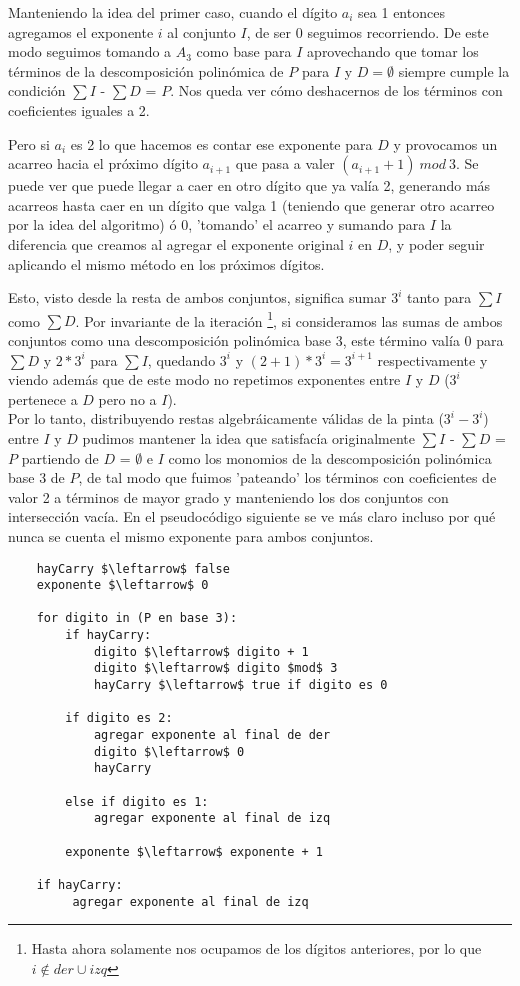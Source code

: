 	Manteniendo la idea del primer caso, cuando el dígito $a_i$ sea 1 entonces agregamos el exponente $i$ al conjunto $I$, de ser 0 seguimos recorriendo. De este modo seguimos tomando a $A_3$ como base para $I$ aprovechando que tomar los términos de la descomposición polinómica de $P$ para $I$ y $D = \emptyset$ siempre cumple la condición $\sum I$ - $\sum D$ = $P$. Nos queda ver cómo deshacernos de los términos con coeficientes iguales a 2.

	Pero si $a_i$ es 2 lo que hacemos es contar ese exponente para $D$ y provocamos un acarreo hacia el próximo dígito $a_{i+1}$ que pasa a valer $(a_{i+1} + 1) \ mod \ 3$. Se puede ver que puede llegar a caer en otro dígito que ya valía 2, generando más acarreos hasta caer en un dígito que valga 1 (teniendo que generar otro acarreo por la idea del algoritmo) ó 0, 'tomando' el acarreo y sumando para $I$ la diferencia que creamos al agregar el exponente original $i$ en $D$, y poder seguir aplicando el mismo método en los próximos dígitos.

	Esto, visto desde la resta de ambos conjuntos, significa sumar $3^{i}$ tanto para $\sum I$ como $\sum D$. Por invariante de la iteración \footnote{Hasta ahora solamente nos ocupamos de los dígitos anteriores, por lo que $i \notin der \cup izq$}, si consideramos las sumas de ambos conjuntos como una descomposición polinómica base 3, este término valía 0 para $\sum D$ y $2*3^{i}$ para $\sum I$, quedando $3^{i}$ y $(2+1)*3^{i} = 3^{i+1}$ respectivamente y viendo además que de este modo no repetimos exponentes entre $I$ y $D$ ($3^i$ pertenece a $D$ pero no a $I$).
	\\
	
	Por lo tanto, distribuyendo restas algebráicamente válidas de la pinta ($3^{i}-3^{i}$) entre $I$ y $D$ pudimos mantener la idea que satisfacía originalmente $\sum I$ - $\sum D$ = $P$ partiendo de $D$ = $\emptyset$ e $I$ como los monomios de la descomposición polinómica base 3 de $P$, de tal modo que fuimos 'pateando' los términos con coeficientes de valor 2 a términos de mayor grado y manteniendo los dos conjuntos con intersección vacía. En el pseudocódigo siguiente se ve más claro incluso por qué nunca se cuenta el mismo exponente para ambos conjuntos.
	
	\newpage

\lstset{basicstyle=\large}
\begin{lstlisting}
    hayCarry $\leftarrow$ false
    exponente $\leftarrow$ 0

    for digito in (P en base 3):
        if hayCarry:
            digito $\leftarrow$ digito + 1
            digito $\leftarrow$ digito $mod$ 3
            hayCarry $\leftarrow$ true if digito es 0

        if digito es 2:
            agregar exponente al final de der
            digito $\leftarrow$ 0
            hayCarry

        else if digito es 1:
            agregar exponente al final de izq

        exponente $\leftarrow$ exponente + 1

    if hayCarry:
         agregar exponente al final de izq

\end{lstlisting}

